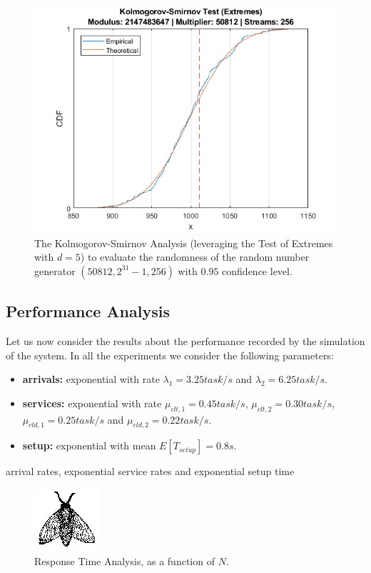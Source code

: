 \begin{figure}
	\label{fig:evaluation-randomness-kolmogorov-smirnov-50812}
	\includegraphics[width=\columnwidth]{fig/evaluation-randomness-kolmogorov-smirnov-50812}
	\caption{The Kolmogorov-Smirnov Analysis (leveraging the Test of Extremes with $d=5$) to evaluate the randomness of the random number generator $(50812,2^{31}-1, 256)$ with $0.95$ confidence level.}
\end{figure}


\subsection{Performance Analysis}
Let us now consider the results about the performance recorded by the simulation of the system.
In all the experiments we consider the following parameters:

\begin{itemize}
	\item \textbf{arrivals:} exponential with rate $\lambda_{1}=3.25 task/s$ and $\lambda_{2}=6.25 task/s$.
	\item \textbf{services:} exponential with rate $\mu_{clt,1} = 0.45 task/s$, $\mu_{clt,2} = 0.30 task/s$, $\mu_{cld,1} = 0.25 task/s$ and $\mu_{cld,2} = 0.22 task/s$.
	\item \textbf{setup:} exponential with mean $E[T_{setup}]=0.8s$.
\end{itemize}

arrival rates, exponential service rates and exponential setup time

\begin{figure}
  \label{fig:evaluation-response-time}
  \includegraphics{fig/fly}
  \caption{Response Time Analysis, as a function of $N$.}
\end{figure}

